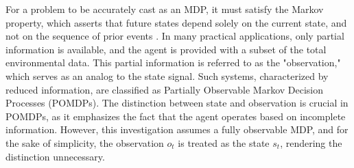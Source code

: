 \documentclass[conference]{IEEEtran}
\begin{document}
For a problem to be accurately cast as an MDP, it must satisfy the Markov property, which asserts that future states depend solely on the current state, and not on the sequence of prior events \cite{48}. In many practical applications, only partial information is available, and the agent is provided with a subset of the total environmental data. This partial information is referred to as the "observation," which serves as an analog to the state signal. Such systems, characterized by reduced information, are classified as Partially Observable Markov Decision Processes (POMDPs). The distinction between state and observation is crucial in POMDPs, as it emphasizes the fact that the agent operates based on incomplete information. However, this investigation assumes a fully observable MDP, and for the sake of simplicity, the observation \( o_t \) is treated as the state \( s_t \), rendering the distinction unnecessary.
\end{document}
